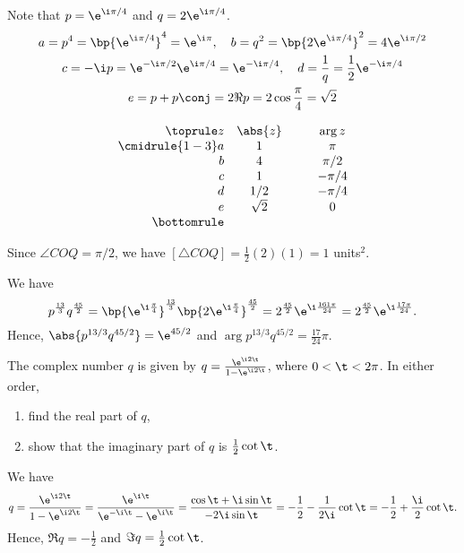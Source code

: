 \begin{solution}
\begin{center}
    \end{center}

    Note that $p = \e^{\i\pi/4}$ and $q = 2\e^{\i\pi/4}$.
    \begin{gather*}
        a = p^4 = \bp{\e^{\i\pi/4}}^4 = \e^{\i\pi}, \quad b = q^2 = \bp{2\e^{\i\pi/4}}^2 = 4\e^{\i\pi/2}\\
        c = -\i p = \e^{-\i\pi/2} \e^{\i\pi/4} = \e^{-\i\pi/4}, \quad d = \frac1q = \frac12 \e^{-\i\pi/4}\\
        e = p + p\conj = 2 \Re p = 2\cos{\frac\pi4} = \sqrt2
    \end{gather*}

    \[
    \begin{array}{r c @{\hspace*{1.0cm}} c}\toprule
        z & \abs{z} & \arg z \\\cmidrule{1-3}
        a & 1 & \pi\\
        b & 4 & \pi/2\\
        c & 1 & -\pi/4\\
        d & 1/2 & -\pi/4\\
        e & \sqrt2 & 0\\\bottomrule
    \end{array}
    \]

    Since $\angle COQ = \pi/2$, we have $[\triangle COQ] = \frac12(2)(1) = 1$ units$^2$.

    We have \[p^{\frac{13}3}q^{\frac{45}2} = \bp{\e^{\i\frac{\pi}4}}^{\frac{13}3} \bp{2\e^{\i\frac{\pi}4}}^{\frac{45}2} = 2^{\frac{45}2} \e^{\i \frac{161\pi}{24}} = 2^{\frac{45}{2}} \e^{\i \frac{17\pi}{24}}.\] Hence, $\abs{p^{13/3}q^{45/2}} = \e^{45/2}$ and $\arg{p^{13/3}q^{45/2}} = \frac{17}{24}\pi$.
\end{solution}

\begin{problem}
    The complex number $q$ is given by $q = \frac{\e^{\i2\t}}{1 - \e^{\i2\t}}$, where $0 < \t < 2\pi$. In either order,
    \begin{enumerate}
        \item find the real part of $q$,
        \item show that the imaginary part of $q$ is $\frac12 \cot\t$.
    \end{enumerate}
\end{problem}
\begin{solution}
    We have \[q = \frac{\e^{\i2\t}}{1 - \e^{\i2\t}} = \frac{\e^{\i\t}}{\e^{-\i\t} - \e^{\i\t}} = \frac{\cos \t + \i \sin \t}{-2\i \sin\t} = -\frac12 - \frac1{2\i} \cot \t
    = -\frac12 + \frac\i2 \cot \t.\] Hence, $\Re q = -\frac12$ and $\Im q = \frac12 \cot \t$.
\end{solution}

